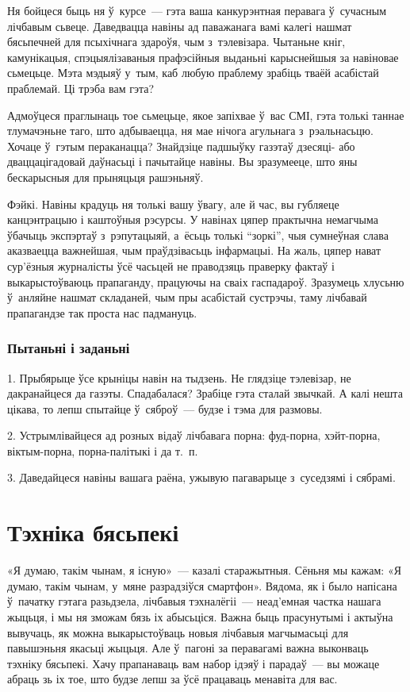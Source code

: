 Ня бойцеся быць ня ў~курсе~--- гэта ваша канкурэнтная перавага ў~сучасным лічбавым сьвеце. Даведвацца навіны ад паважанага вамі калегі нашмат бясьпечней для псыхічнага здароўя, чым з~тэлевізара. Чытаньне кніг, камунікацыя, спэцыялізаваныя прафэсійныя выданьні карыснейшыя за навіновае сьмецьце. Мэта мэдыяў у~тым, каб любую праблему зрабіць тваёй асабістай праблемай. Ці трэба вам гэта?

Адмоўцеся праглынаць тое сьмецьце, якое запіхвае ў~вас СМІ, гэта толькі таннае тлумачэньне таго, што адбываецца, ня мае нічога агульнага з~рэальнасьцю. Хочаце ў~гэтым пераканацца? Знайдзіце падшыўку газэтаў дзесяці- або дваццацігадовай даўнасьці і пачытайце навіны. Вы зразумееце, што яны бескарысныя для прыняцьця рашэньняў.

Фэйкі. Навіны крадуць ня толькі вашу ўвагу, але й час, вы губляеце канцэнтрацыю і каштоўныя рэсурсы. У навінах цяпер практычна немагчыма ўбачыць экспэртаў з~рэпутацыяй, а~ёсьць толькі ``зоркі'', чыя сумнеўная слава аказваецца важнейшая, чым праўдзівасьць інфармацыі. На жаль, цяпер нават сур'ёзныя журналісты ўсё часьцей не праводзяць праверку фактаў і выкарыстоўваюць прапаганду, працуючы на сваіх гаспадароў. Зразумець хлусьню ў~анляйне нашмат складаней, чым пры асабістай сустрэчы, таму лічбавай прапагандзе так проста нас падмануць.

\subsubsection{Пытаньні і заданьні}

1. Прыбярыце ўсе крыніцы навін на тыдзень. Не глядзіце тэлевізар, не дакранайцеся да газэты. Спадабалася? Зрабіце гэта сталай звычкай. А калі нешта цікава, то лепш спытайце ў~сяброў~--- будзе і тэма для размовы.

2. Устрымлівайцеся ад розных відаў лічбавага порна: фуд-порна, хэйт-порна, віктым-порна, порна-палітыкі і да т.~п.

3. Даведайцеся навіны вашага раёна, ужывую пагаварыце з~суседзямі і сябрамі.


\section{Тэхніка бясьпекі}

«Я думаю, такім чынам, я існую»~--- казалі старажытныя. Сёньня мы кажам: «Я думаю, такім чынам, у~мяне разрадзіўся смартфон». Вядома, як і было напісана ў~пачатку гэтага разьдзела, лічбавыя тэхналёгіі~--- неад'емная частка нашага жыцьця, і мы ня зможам бязь іх абысьціся. Важна быць прасунутымі і актыўна вывучаць, як можна выкарыстоўваць новыя лічбавыя магчымасьці для павышэньня якасьці жыцьця. Але ў~пагоні за перавагамі важна выконваць тэхніку бясьпекі. Хачу прапанаваць вам набор ідэяў і парадаў~--- вы можаце абраць зь іх тое, што будзе лепш за ўсё працаваць менавіта для вас.

